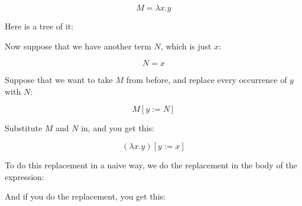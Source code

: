 \documentclass{book}
\numberwithin{equation}{chapter}
\begin{document}
\begin{equation}
M = \lambda x.y
\end{equation}

\noindent
Here is a tree of it:

\begin{center}
\end{center}

\noindent
Now suppose that we have another term $N$, which is just $x$:

\begin{equation}
N = x
\end{equation}

\noindent
Suppose that we want to take $M$ from before, and replace every occurrence of $y$ with $N$:

\begin{equation}
M[y := N]
\end{equation}

\noindent
Substitute $M$ and $N$ in, and you get this:

\begin{equation}
(\lambda x.y)[y := x]
\end{equation}

\noindent
To do this replacement in a naive way, we do the replacement in the body of the expression:

\begin{center}
\end{center}

\noindent
And if you do the replacement, you get this:

\begin{center}
\end{center}
\end{document}
